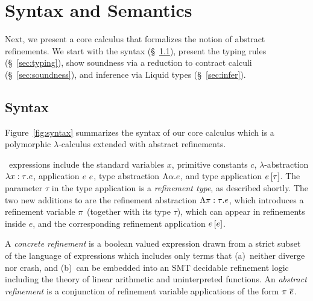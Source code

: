 \section{Syntax and Semantics}\label{sec:check}


Next, we present a core calculus \corelan that formalizes the notion
of abstract refinements. We start with the syntax (\S~\ref{sec:syntax}),
present the typing rules (\S~\ref{sec:typing}), show soundness 
via a reduction to contract calculi \cite{Knowles10,Greenberg11}
(\S~\ref{sec:soundness}), and inference via Liquid types (\S~\ref{sec:infer}).

\subsection{Syntax}\label{sec:syntax}

Figure~\ref{fig:syntax} summarizes the syntax of our core 
calculus \corelan which is a polymorphic $\lambda$-calculus 
extended with abstract refinements. 

\corelan\ expressions include the standard variables $x$, 
primitive constants $c$, $\lambda$-abstraction $\lambda {x:\tau}. e$,
application ${e} \ {e}$, type abstraction $\Lambda \alpha . e$,
and type application ${e} \left[ {\tau}\right]$. The parameter $\tau$ in 
the type application is a \emph{refinement type}, as described shortly.
The two new additions to \corelan are the refinement abstraction
$\Lambda {\pi:\tau} . e$, which introduces a refinement variable 
$\pi$ (together with its type $\tau$), which can appear in refinements
inside $e$, and the corresponding refinement application ${e} \left[ e\right]$.
%

A \emph{concrete refinement}  is a boolean valued expression  
drawn from a strict subset of the language of expressions which
includes only terms that 
(a)~neither diverge nor crash, and 
(b)~can be embedded into an SMT decidable refinement logic including 
the theory of linear arithmetic and uninterpreted functions.
%
An \emph{abstract refinement} \areft is a conjunction of refinement
variable applications of the form ${\pi \ \overline{e}}$.

